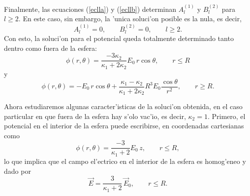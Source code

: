 Finalmente, las ecuaciones (\ref{eclla}) y (\ref{ecllb}) determinan $A_l^{(1)}$ y $B_l^{(2)}$ para $l\ge 2$. En este caso, sin embargo, la 'unica soluci'on posible es la nula, es decir,
\begin{equation}
A_l^{(1)}=0, \qquad B_l^{(2)}=0, \qquad l\ge 2.
\end{equation}
Con esto, la soluci'on para el potencial queda totalmente determinado tanto dentro como fuera de la esfera:
\begin{equation}
\phi(r,\theta)=\frac{-3\kappa_2}{\kappa_1+2\kappa_2}E_0\,r\cos\theta, \qquad r\le R
\end{equation}
y
\begin{equation}
\phi(r,\theta)=-E_0\,r\cos\theta +\frac{\kappa_1-\kappa_2}{\kappa_1+2\kappa_2}R^3E_0 \frac{\cos\theta}{r^2}, \qquad r\ge R.
\end{equation}
 
 Ahora estudiaremos algunas caracter'isticas de la soluci'on obtenida, en el caso particular en que fuera de la esfera hay s'olo vac'io, es decir, $\kappa_2=1$. Primero, el potencial en el interior de la esfera puede escribirse, en coordenadas cartesianas como
 \begin{equation}
\phi(r,\theta)=\frac{-3}{\kappa_1+2}E_0\,z, \qquad r\le R,
\end{equation}
lo que implica que el campo el'ectrico en el interior de la esfera es homog'eneo y dado por
\begin{equation}
\vec{E}=\frac{3}{\kappa_1+2}\,\vec{E}_0, \qquad r\le R.
\end{equation}

